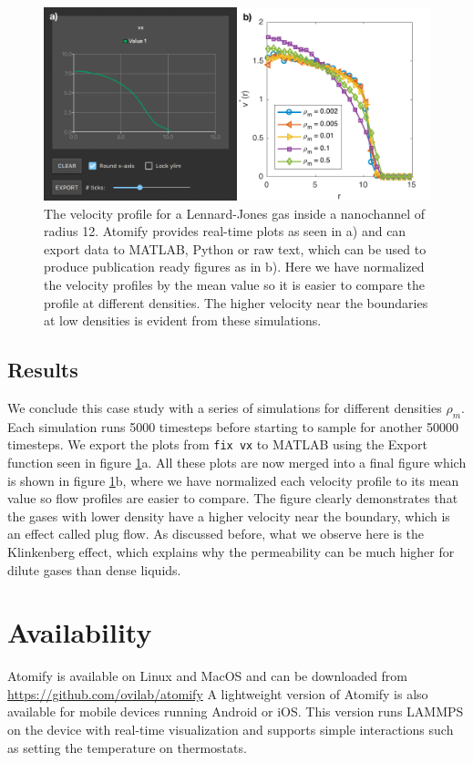 \documentclass[12pt,a4paper,final]{iopart}
\newcommand{\code}[1]{\colorbox{light-gray}{\color{RawSienna}\texttt{#1}}}
\begin{document}
\begin{figure}
	\centering
	\includegraphics[width=\textwidth]{figures/velocity_profile.pdf}
	\caption{
		The velocity profile for a Lennard-Jones gas inside a nanochannel of radius 12.
		Atomify provides real-time plots as seen in a) and can export data to MATLAB, Python
		or raw text, which can be used to produce publication ready figures as in b).
		Here we have normalized the velocity profiles by the mean value so it is easier
		to compare the profile at different densities. The higher velocity near the boundaries at low densities
		is evident from these simulations.
	}
	\label{fig:velocity_profile1}
\end{figure}

\subsection{Results}
We conclude this case study with a series of simulations for different densities $\rho_m$.
Each simulation runs 5000 timesteps before starting to sample for another 50000 timesteps.
We export the plots from \code{fix vx} to MATLAB using the Export function seen in figure \ref{fig:velocity_profile1}a.
%
%
All these plots are now merged into a final figure which is shown in figure \ref{fig:velocity_profile1}b, where
we have normalized each velocity profile to its mean value so flow profiles are easier to compare.
The figure clearly demonstrates that the gases with lower density have a higher velocity near the boundary, which is an effect called plug flow.
As discussed before, what we observe here is the Klinkenberg effect, which explains why the permeability can be much higher for dilute gases than dense liquids.

\section{Availability}
Atomify is available on Linux and MacOS and can be downloaded from
\url{https://github.com/ovilab/atomify}
A lightweight version of Atomify is also available for mobile devices running
Android or iOS. This version runs LAMMPS on the device with real-time visualization
and supports simple interactions such as setting the temperature on thermostats.
\end{document}
